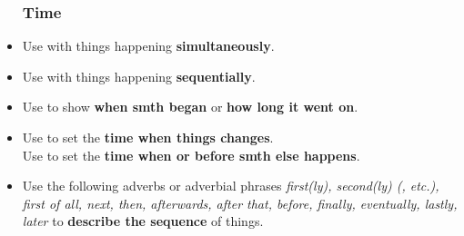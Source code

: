 \begin{itemize}
    \subsubsection{Time}
    \item[\doot] Use  with things happening \textbf{simultaneously}.
    \item[\doot] Use 
    with things happening \textbf{sequentially}.
    \item[\doot] Use  to show \textbf{when smth began} or \textbf{how long it went on}.
    \item[\doot] Use  to set the \textbf{time when things changes}.\\
    Use  to set the \textbf{time when or before smth else happens}.
    \item[\doot] Use the following adverbs or adverbial phrases
    \textit{\emph{first(ly), second(ly) (, etc.), first of all, next, then, afterwards, after that,
    before, finally, eventually, lastly, later}} to \textbf{describe the sequence} of things.
\end{itemize}

